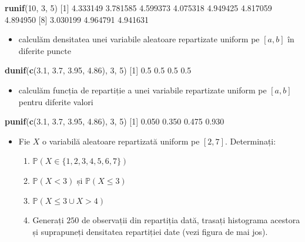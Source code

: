 \documentclass[]{article}
\newenvironment{Shaded}{\begin{snugshade}}{\end{snugshade}}
\newcommand{\KeywordTok}[1]{\textcolor[rgb]{0.13,0.29,0.53}{\textbf{#1}}}
\newcommand{\DecValTok}[1]{\textcolor[rgb]{0.00,0.00,0.81}{#1}}
\newcommand{\FloatTok}[1]{\textcolor[rgb]{0.00,0.00,0.81}{#1}}
\newcommand{\NormalTok}[1]{#1}
\providecommand{\tightlist}{%
  \setlength{\itemsep}{0pt}\setlength{\parskip}{0pt}}
\newenvironment{frshaded*}{%
  \def\FrameCommand{\fboxrule=\FrameRule\fboxsep=\FrameSep \fcolorbox{framecolor}{shadecolor1}}%
  \MakeFramed {\advance\hsize-\width \FrameRestore}}%
{\endMakeFramed}
\newenvironment{rmdblock}[1]
  {\begin{frshaded*}
  \begin{itemize}
  \renewcommand{\labelitemi}{
    \raisebox{-.7\height}[0pt][0pt]{
      {\setkeys{Gin}{width=2em,keepaspectratio}\texttt{[image: images/icons/\#1]}}
    }
  }
  \item
  }
  {
  \end{itemize}
  \end{frshaded*}
  }
\newenvironment{rmdexercise}
  {\begin{rmdblock}{exercise}}
  {\end{rmdblock}}
\begin{document}
\begin{Shaded}
\begin{Highlighting}[]
\KeywordTok{runif}\NormalTok{(}\DecValTok{10}\NormalTok{, }\DecValTok{3}\NormalTok{, }\DecValTok{5}\NormalTok{)}
\NormalTok{ [}\DecValTok{1}\NormalTok{] }\FloatTok{4.333149} \FloatTok{3.781585} \FloatTok{4.599373} \FloatTok{4.075318} \FloatTok{4.949425} \FloatTok{4.817059} \FloatTok{4.894950}
\NormalTok{ [}\DecValTok{8}\NormalTok{] }\FloatTok{3.030199} \FloatTok{4.964791} \FloatTok{4.941631}
\end{Highlighting}
\end{Shaded}

\begin{itemize}
\tightlist
\item
  calculăm densitatea unei variabile aleatoare repartizate uniform pe
  \([a, b]\) în diferite puncte
\end{itemize}

\begin{Shaded}
\begin{Highlighting}[]
\KeywordTok{dunif}\NormalTok{(}\KeywordTok{c}\NormalTok{(}\FloatTok{3.1}\NormalTok{, }\FloatTok{3.7}\NormalTok{, }\FloatTok{3.95}\NormalTok{, }\FloatTok{4.86}\NormalTok{), }\DecValTok{3}\NormalTok{, }\DecValTok{5}\NormalTok{)}
\NormalTok{[}\DecValTok{1}\NormalTok{] }\FloatTok{0.5} \FloatTok{0.5} \FloatTok{0.5} \FloatTok{0.5}
\end{Highlighting}
\end{Shaded}

\begin{itemize}
\tightlist
\item
  calculăm funcția de repartiție a unei variabile repartizate uniform pe
  \([a,b]\) pentru diferite valori
\end{itemize}

\begin{Shaded}
\begin{Highlighting}[]
\KeywordTok{punif}\NormalTok{(}\KeywordTok{c}\NormalTok{(}\FloatTok{3.1}\NormalTok{, }\FloatTok{3.7}\NormalTok{, }\FloatTok{3.95}\NormalTok{, }\FloatTok{4.86}\NormalTok{), }\DecValTok{3}\NormalTok{, }\DecValTok{5}\NormalTok{)}
\NormalTok{[}\DecValTok{1}\NormalTok{] }\FloatTok{0.050} \FloatTok{0.350} \FloatTok{0.475} \FloatTok{0.930}
\end{Highlighting}
\end{Shaded}

\begin{rmdexercise}
Fie \(X\) o variabilă aleatoare repartizată uniform pe \([2,7]\).
Determinați:

\begin{enumerate}
\def\labelenumi{\alph{enumi})}
\tightlist
\item
  \(\mathbb{P}(X\in\{1,2,3,4,5,6,7\})\)
\item
  \(\mathbb{P}(X<3)\) și \(\mathbb{P}(X\leq 3)\)
\item
  \(\mathbb{P}(X\leq 3 \cup X>4)\)
\item
  Generați \(250\) de observații din repartiția dată, trasați histograma
  acestora și suprapuneți densitatea repartiției date (vezi figura de
  mai jos).
\end{enumerate}
\end{rmdexercise}
\end{document}
